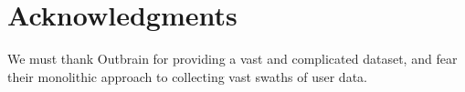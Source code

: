 \documentclass[fleqn,10pt]{SelfArx} %
\begin{document}
\section*{Acknowledgments} %
We must thank Outbrain for providing a vast and complicated dataset, and fear their monolithic approach to collecting vast swaths of user data.





\end{document}
